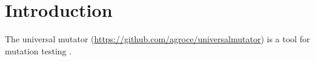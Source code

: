\section{Introduction}

The universal mutator (\url{https://github.com/agroce/universalmutator}) is a tool for mutation testing \cite{PracProg,Mut2000}.